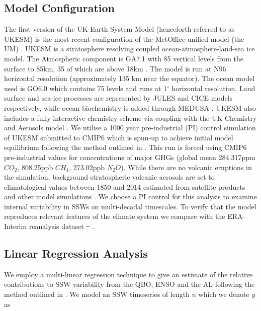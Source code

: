 \documentclass[wcd, manuscript]{copernicus}
\providecommand{\DIFadd}[1]{{\protect\color{blue}\uwave{#1}}} %
\providecommand{\DIFdel}[1]{{\protect\color{red}\sout{#1}}}                      %
\providecommand{\DIFaddbegin}{} %
\providecommand{\DIFaddend}{} %
\providecommand{\DIFdelbegin}{} %
\providecommand{\DIFdelend}{} %
\begin{document}
\subsection{Model Configuration}
The first version of the UK Earth System Model (henceforth referred to as UKESM) is the most recent configuration of the MetOffice unified model (the UM) \citep{Mulcahy2018}. UKESM is a stratosphere resolving coupled ocean-atmosphere-land-sea ice model. The Atmospheric component is GA7.1 with 85 vertical levels from the surface to 85km, 35 of which are above 18km \citep{Walters2019, Williams2018}. The model is run at N96 horizontal resolution (approximately 135 km near the equator). The ocean model used is GO6.0 \citep{Storkey2018} which contains 75 levels and runs at 1${^\circ}$ horizontal resolution. Land surface and sea-ice processes are represented by JULES \citep[GL7.0,][]{Walters2019} and CICE  \cite[GSI8.1,][]{Ridley2018} models respectively, while ocean biochemistry is added through MEDUSA \citep{Yool2013}. UKESM also includes a fully interactive chemistry scheme via coupling with the UK Chemistry and Aerosols model \citep[UKCA,][]{Mulcahy2018}. We utilise a 1000 year pre-industrial (PI) control simulation of UKESM submitted to CMIP6 which is spun-up to achieve initial model equilibrium following the method outlined in \cite{Yool20}. This run is forced using CMIP6 pre-industrial values for concentrations of major GHGs (global mean 284.317ppm $CO_2$, 808.25ppb $CH_4$, 273.02ppb $N_2O$). While there are no volcanic eruptions in the simulation, background stratospheric volcanic aerosols are set to climatological values between 1850 and 2014 estimated from satellite products and other model simulations \citep{Menary2018}. We choose a PI control for this analysis to examine internal variability in SSWs on multi-decadal timescales. To verify that the model reproduces relevant features of the climate system we compare with the ERA-Interim reanalysis dataset \DIFdelbegin \DIFdel{\mbox{%
\cite{Dee2011}}\hspace{0pt}%
}\DIFdelend \DIFaddbegin \DIFadd{\mbox{%
\citep{Dee2011}}\hspace{0pt}%
}\DIFaddend . 

\subsection{Linear Regression Analysis}
We employ a multi-linear regression technique to give an estimate of the relative contributions to SSW variability from the QBO, ENSO and the AL following the method outlined in \cite{Krzywinski}. We model an SSW timeseries of length $n$ which we denote $y$ as 
\end{document}
